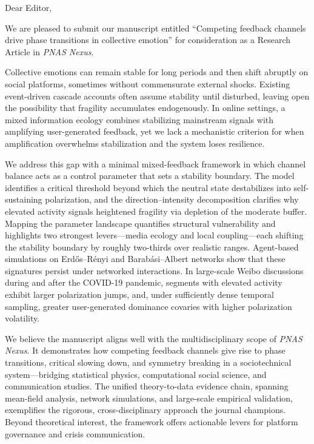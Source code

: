 \documentclass[11pt]{article}
\begin{document}
Dear Editor,

We are pleased to submit our manuscript entitled ``Competing feedback channels drive phase transitions in collective emotion'' for consideration as a Research Article in \textit{PNAS Nexus}.

Collective emotions can remain stable for long periods and then shift abruptly on social platforms, sometimes without commensurate external shocks. Existing event-driven cascade accounts often assume stability until disturbed, leaving open the possibility that fragility accumulates endogenously. In online settings, a mixed information ecology combines stabilizing mainstream signals with amplifying user-generated feedback, yet we lack a mechanistic criterion for when amplification overwhelms stabilization and the system loses resilience.

We address this gap with a minimal mixed-feedback framework in which channel balance acts as a control parameter that sets a stability boundary. The model identifies a critical threshold beyond which the neutral state destabilizes into self-sustaining polarization, and the direction--intensity decomposition clarifies why elevated activity signals heightened fragility via depletion of the moderate buffer. Mapping the parameter landscape quantifies structural vulnerability and highlights two strongest levers---media ecology and local coupling---each shifting the stability boundary by roughly two-thirds over realistic ranges. Agent-based simulations on Erd\H{o}s--R\'enyi and Barab\'asi--Albert networks show that these signatures persist under networked interactions. In large-scale Weibo discussions during and after the COVID-19 pandemic, segments with elevated activity exhibit larger polarization jumps, and, under sufficiently dense temporal sampling, greater user-generated dominance covaries with higher polarization volatility.

We believe the manuscript aligns well with the multidisciplinary scope of \textit{PNAS Nexus}. It demonstrates how competing feedback channels give rise to phase transitions, critical slowing down, and symmetry breaking in a sociotechnical system---bridging statistical physics, computational social science, and communication studies. The unified theory-to-data evidence chain, spanning mean-field analysis, network simulations, and large-scale empirical validation, exemplifies the rigorous, cross-disciplinary approach the journal champions. Beyond theoretical interest, the framework offers actionable levers for platform governance and crisis communication.
\end{document}

